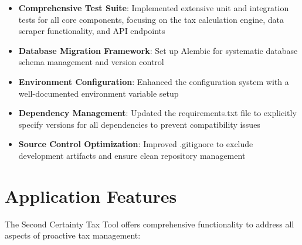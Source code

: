 \documentclass[
  11pt,
  letterpaper,
]{article}
\providecommand{\tightlist}{%
  \setlength{\itemsep}{0pt}\setlength{\parskip}{0pt}}\usepackage{longtable,booktabs,array}
\begin{document}
\begin{itemize}
\tightlist
\item
  \textbf{Comprehensive Test Suite}: Implemented extensive unit and
  integration tests for all core components, focusing on the tax
  calculation engine, data scraper functionality, and API endpoints
\item
  \textbf{Database Migration Framework}: Set up Alembic for systematic
  database schema management and version control
\item
  \textbf{Environment Configuration}: Enhanced the configuration system
  with a well-documented environment variable setup
\item
  \textbf{Dependency Management}: Updated the requirements.txt file to
  explicitly specify versions for all dependencies to prevent
  compatibility issues
\item
  \textbf{Source Control Optimization}: Improved .gitignore to exclude
  development artifacts and ensure clean repository management
\end{itemize}

\hypertarget{application-features}{%
\section{Application Features}\label{application-features}}

The Second Certainty Tax Tool offers comprehensive functionality to
address all aspects of proactive tax management:
\end{document}
